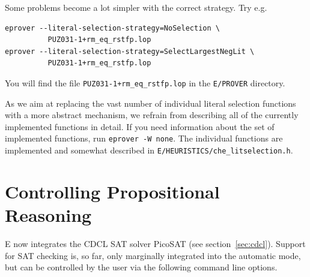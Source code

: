 \documentclass{report}
\begin{document}
\begin{example}
  Some problems become a lot simpler with the correct
  strategy. Try e.g.
\begin{verbatim}
eprover --literal-selection-strategy=NoSelection \
          PUZ031-1+rm_eq_rstfp.lop
eprover --literal-selection-strategy=SelectLargestNegLit \
          PUZ031-1+rm_eq_rstfp.lop
\end{verbatim}
  You will find the file \texttt{PUZ031-1+rm\_eq\_rstfp.lop} in the
  \texttt{E/PROVER} directory.
\end{example}

As we aim at replacing the vast number of individual literal selection
functions with a more abstract mechanism, we refrain from describing
all of the currently implemented functions in detail. If you need
information about the set of implemented functions, run
\texttt{eprover -W none}. The individual functions are implemented and
somewhat described in \texttt{E/HEURISTICS/che\_litselection.h}.


\section{Controlling Propositional Reasoning}
\label{sec:cdclopt}

E now integrates the CDCL SAT solver PicoSAT (see
section~\ref{sec:cdcl}).  Support for SAT checking is, so far, only
marginally integrated into the automatic mode, but can be controlled
by the user via the following command line options.
\end{document}

